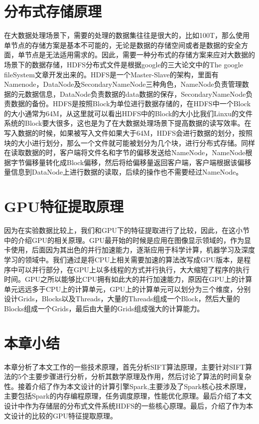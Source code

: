 \section{分布式存储原理}
在大数据处理场景下，需要的处理的数据集往往是很大的，比如100T，那么使用单节点的存储方案是基本不可能的，无论是数据的存储空间或者是数据的安全方面，单节点是无法适用需求的。因此，需要一种分布式的存储方案来应对大数据的场景下的数据存储，HDFS分布式文件是根据google的三大论文中的The google fileSystem文章开发出来的。HDFS是一个Master-Slave的架构，里面有Namenode，DataNode及SecondaryNameNode三种角色，NameNode负责管理数据的元数据信息，DataNode负责数据的data数据的保存，SecondaryNameNode负责数据的备份。HDFS是按照Block为单位进行数据存储的，在HDFS中一个Block的大小通常为64M，从这里就可以看出HDFS中的Block的大小比我们Linxu的文件系统的Block要大很多，这也是为了在大数据处理场景下提高数据的读写效率。在写入数据的时候，如果被写入文件如果大于64M，HDFS会进行数据的划分，按照块的大小进行划分，那么一个文件就可能被划分为几个块，进行分布式存储。同样在读取数据的时，客户端将文件名和字节的偏移发送给NameNode，NameNode根据字节偏移量转化成Block偏移，然后将给偏移量返回客户端，客户端根据该偏移量信息到DataNode上进行数据的读取，后续的操作也不需要经过NameNode。
\section{GPU特征提取原理}
因为在实验数据比较上，我们和GPU下的特征提取进行了比较，因此，在这小节中的介绍GPU的相关原理。GPU最开始的时候是应用在图像显示领域的，作为显卡使用，后面因为其出色的并行加速能力，逐渐应用于科学计算，机器学习及深度学习的领域中。我们通过是将CPU上相关需要加速的算法改写成GPU版本，是程序中可以并行部分，在GPU上以多线程的方式并行执行，大大缩短了程序的执行时间。GPU之所以能够比CPU拥有如此大的并行加速能力，原因在GPU上的计算单元远远多于CPU上的计算单元，GPU上的计算单元可以划分为三个维度，分别设计Grids，Blocks以及Threads，大量的Threads组成一个Block，然后大量的Blocks组成一个Grids，最后由大量的Grids组成强大的计算能力。
\section{本章小结}
本章分析了本文工作的一些技术原理，首先分析SIFT算法原理，主要针对SIFT算法的5个主要步骤进行分析，分析其数学原理及作用，然后讨论了算法的时间复杂性。接着介绍了作为本文设计的计算引擎Spark,主要涉及了Spark核心技术原理，主要包括Spark的内存编程原理，任务调度原理，性能优化原理。最后介绍了本文设计中作为存储层的分布式文件系统HDFS的一些核心原理。最后，介绍了作为本文设计的比较的GPU特征提取原理。


